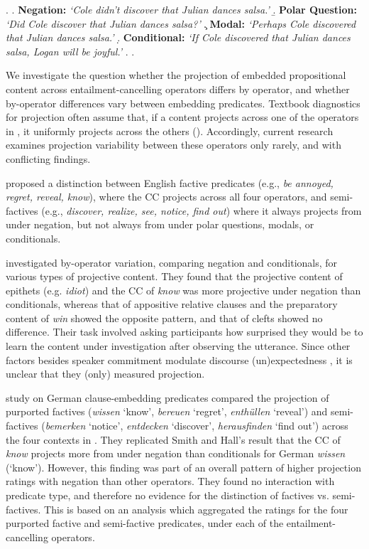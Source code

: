 \documentclass[a4paper,12pt,twoside]{article}
\begin{document}
	\ex. \label{ex:family}
		\a. \label{ex:neg}
			{\bf Negation:} \hfill
			\emph{\lq Cole didn't discover that Julian dances salsa.\rq}
		\b. \label{ex:q}
			{\bf Polar Question:} \hfill
			\emph{\lq Did Cole discover that Julian dances salsa?\rq}
		\c. \label{ex:mod}
			{\bf Modal:} \hfill
			\emph{\lq Perhaps Cole discovered that Julian dances salsa.\rq}
		\d. \label{ex:cond}
			{\bf Conditional:} \hfill
			\emph{\lq If Cole discovered that Julian dances salsa, Logan will be joyful.\rq}
		\z.
	\z.
	
	We investigate the question whether the projection of embedded propositional content across entailment-cancelling operators differs by operator, and whether by-operator differences vary between embedding predicates.
	Textbook diagnostics for projection often assume that, if a content projects across one of the operators in \Last, it uniformly projects across the others (\citealt{chierchia_meaning_1990}). Accordingly, current research examines projection variability between these operators only rarely, and with conflicting findings.
	
	\citet{karttunen_observations_1971} proposed a distinction between English factive predicates (e.g., \textit{be annoyed, regret, reveal, know}), where the CC projects across all four operators, and semi-factives (e.g., \textit{discover, realize, see, notice, find out}) where it always projects from under negation, but not always from under polar questions, modals, or conditionals. 

	\citet{smith_relationship_2014} investigated by-operator variation, comparing negation and conditionals, for various types of projective content. They found that the projective content of epithets (e.g. \textit{idiot}) and the CC of \textit{know} was more projective under negation than conditionals, whereas that of appositive relative clauses and the preparatory content of \textit{win} showed the opposite pattern, and that of clefts showed no difference. Their task involved asking participants how surprised they would be to learn the content under investigation after observing the utterance. Since other factors besides speaker commitment modulate discourse (un)expectedness \citep[see e.g.][]{zimmermann_grammatical_2011,tonnis_german_2021}, it is unclear that they (only) measured projection. 

	 study on German clause-embedding predicates compared the projection of purported factives (\textit{wissen} `know', \textit{bereuen} `regret', \textit{enthüllen} `reveal') and semi-factives (\textit{bemerken} `notice', \textit{entdecken} `discover', \textit{herausfinden} `find out') across the four contexts in \Last. They replicated Smith and Hall's result that the CC of \textit{know} projects more from under negation than conditionals for German \textit{wissen} (`know'). However, this finding was part of an overall pattern of higher projection ratings with negation than other operators. They found no interaction with predicate type, and therefore no evidence for the distinction of factives vs. semi-factives. This is based on an analysis which aggregated the ratings for the four purported factive and semi-factive predicates, under each of the entailment-cancelling operators. 
\end{document}
